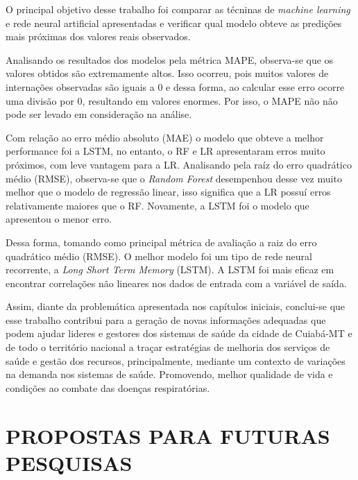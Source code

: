 \documentclass[
  12pt,		%
  a4paper,	%
  openright,%
  oneside,	%
  chapter=TITLE,		%
  section=TITLE,		%
  english,	%
  french,	%
  spanish,	%
  brazil	%
]{abntex2}
\begin{document}
    O principal objetivo desse trabalho foi comparar as técninas de \textit{machine learning} e rede neural artificial apresentadas
    e verificar qual modelo obteve as predições mais próximas dos valores reais observados. 

    Analisando os resultados dos modelos pela métrica MAPE, observa-se que os valores obtidos são extremamente altos. Isso ocorreu, pois muitos valores
    de internações observadas são iguais a 0 e dessa forma, ao calcular esse erro ocorre uma divisão por 0, resultando em valores enormes. Por isso, o MAPE não
    não pode ser levado em consideração na análise.

    Com relação ao erro médio absoluto (MAE) o modelo que obteve a melhor performance foi a LSTM, no entanto, o RF e LR apresentaram erros
    muito próximos, com leve vantagem para a LR. Analisando pela raíz do erro quadrático médio (RMSE), observa-se que o \textit{Random Forest}
    desempenhou desse vez muito melhor que o modelo de regressão linear, isso significa que a LR possuí erros relativamente maiores que o RF. Novamente,
    a LSTM foi o modelo que apresentou o menor erro.

    Dessa forma, tomando como principal métrica de avaliação a raiz do erro quadrático médio (RMSE). 
    O melhor modelo foi um tipo de rede neural recorrente, a \textit{Long Short Term Memory}
    (LSTM). A LSTM foi mais eficaz em encontrar correlações não lineares nos dados de entrada com a variável de saída.

    Assim, diante da problemática apresentada nos capítulos iniciais, conclui-se que esse trabalho contribui para a geração
    de novas informações adequadas que podem ajudar lideres e gestores dos sistemas de saúde da cidade de Cuiabá-MT 
    e de todo o território nacional a traçar estratégias de melhoria dos serviços de saúde e gestão dos recursos, principalmente, 
    mediante um contexto de variações na demanda nos sistemas de saúde. Promovendo, melhor qualidade de vida e 
    condições ao combate das doenças respiratórias.




    \section{PROPOSTAS PARA FUTURAS PESQUISAS}
\end{document}
